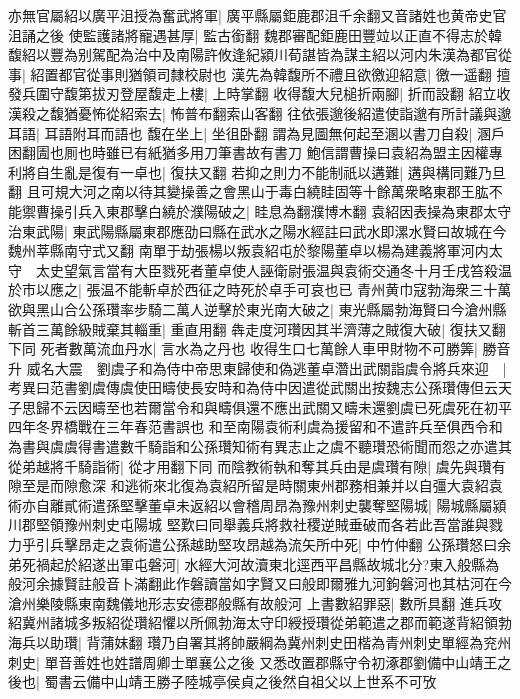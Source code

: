 亦無官屬紹以廣平沮授為奮武將軍|{
	廣平縣屬鉅鹿郡沮千余翻又音諸姓也黄帝史官沮誦之後}
使監護諸將寵遇甚厚|{
	監古銜翻}
魏郡審配鉅鹿田豐竝以正直不得志於韓馥紹以豐為别駕配為治中及南陽許攸逢紀潁川荀諶皆為謀主紹以河内朱漢為都官從事|{
	紹置都官從事則猶領司隸校尉也}
漢先為韓馥所不禮且欲徼迎紹意|{
	徼一遥翻}
擅發兵圍守馥第拔刃登屋馥走上樓|{
	上時掌翻}
收得馥大兒槌折兩腳|{
	折而設翻}
紹立收漢殺之馥猶憂怖從紹索去|{
	怖普布翻索山客翻}
往依張邈後紹遣使詣邈有所計議與邈耳語|{
	耳語附耳而語也}
馥在坐上|{
	坐徂卧翻}
謂為見圖無何起至溷以書刀自殺|{
	溷戶困翻圊也厠也時雖已有紙猶多用刀筆書故有書刀}
鮑信謂曹操曰袁紹為盟主因權專利將自生亂是復有一卓也|{
	復扶又翻}
若抑之則力不能制祇以遘難|{
	遘與構同難乃旦翻}
且可規大河之南以待其變操善之會黑山于毒白繞眭固等十餘萬衆略東郡王肱不能禦曹操引兵入東郡擊白繞於濮陽破之|{
	眭息為翻濮博木翻}
袁紹因表操為東郡太守治東武陽|{
	東武陽縣屬東郡應劭曰縣在武水之陽水經註曰武水即漯水賢曰故城在今魏州莘縣南守式又翻}
南單于劫張楊以叛袁紹屯於黎陽董卓以楊為建義將軍河内太守　太史望氣言當有大臣戮死者董卓使人誣衛尉張温與袁術交通冬十月壬戌笞殺温於市以應之|{
	張温不能斬卓於西征之時死於卓手可哀也已}
青州黄巾寇勃海衆三十萬欲與黑山合公孫瓚率步騎二萬人逆擊於東光南大破之|{
	東光縣屬勃海賢曰今滄州縣}
斬首三萬餘級賊棄其輜重|{
	重直用翻}
犇走度河瓚因其半濟薄之賊復大破|{
	復扶又翻下同}
死者數萬流血丹水|{
	言水為之丹也}
收得生口七萬餘人車甲財物不可勝筭|{
	勝音升}
威名大震　劉虞子和為侍中帝思東歸使和偽逃董卓濳出武關詣虞令將兵來迎　|{
	考異曰范書劉虞傳虞使田疇使長安時和為侍中因遣從武關出按魏志公孫瓚傳但云天子思歸不云因疇至也若爾當令和與疇俱還不應出武關又疇未還劉虞已死虞死在初平四年冬界橋戰在三年春范書誤也}
和至南陽袁術利虞為援留和不遣許兵至俱西令和為書與虞虞得書遣數千騎詣和公孫瓚知術有異志止之虞不聽瓚恐術聞而怨之亦遣其從弟越將千騎詣術|{
	從才用翻下同}
而陰教術執和奪其兵由是虞瓚有隙|{
	虞先與瓚有隙至是而隙愈深}
和逃術來北復為袁紹所留是時關東州郡務相兼并以自彊大袁紹袁術亦自離貳術遣孫堅擊董卓未返紹以會稽周昂為豫州刺史襲奪堅陽城|{
	陽城縣屬潁川郡堅領豫州刺史屯陽城}
堅歎曰同舉義兵將救社稷逆賊垂破而各若此吾當誰與戮力乎引兵擊昂走之袁術遣公孫越助堅攻昂越為流矢所中死|{
	中竹仲翻}
公孫瓚怒曰余弟死禍起於紹遂出軍屯磐河|{
	水經大河故瀆東北逕西平昌縣故城北分?東入般縣為般河余據賢註般音卜滿翻此作磐讀當如字賢又曰般即爾雅九河鉤磐河也其枯河在今滄州樂陵縣東南魏儀地形志安德郡般縣有故般河}
上書數紹罪惡|{
	數所具翻}
進兵攻紹冀州諸城多叛紹從瓚紹懼以所佩勃海太守印綬授瓚從弟範遣之郡而範遂背紹領勃海兵以助瓚|{
	背蒲妺翻}
瓚乃自署其將帥嚴綱為冀州刺史田楷為青州刺史單經為兖州刺史|{
	單音善姓也姓譜周卿士單襄公之後}
又悉改置郡縣守令初涿郡劉備中山靖王之後也|{
	蜀書云備中山靖王勝子陸城亭侯貞之後然自祖父以上世系不可攷}

